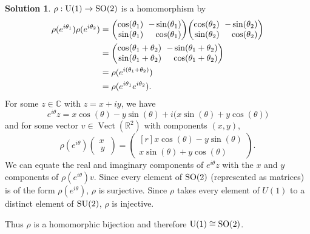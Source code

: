 \documentclass[11pt, a4paper]{report}
\theoremstyle{definition}
\newtheorem{solution}{Solution}[part]
\newenvironment{sol}{\begin{solution}}{\end{solution}\pagebreak[3]}
\newcommand*{\settightmatrix}{\ensuremath\setlength{\arraycolsep}{0.7ex}}
\newenvironment{tightmatrix}
    {\settightmatrix}{}
\newcommand*{\SO}{\ensuremath\text{SO}}
\newcommand*{\U}{\ensuremath\text{U}}
\newcommand*{\SU}{\ensuremath\text{SU}}
\DeclareMathOperator{\Vect}{Vect}
\begin{document}
\begin{sol}

$\rho: \U(1) \to \SO(2)$ is a homomorphism by
\begin{align*}
    \rho(e^{i\theta_1}) \rho(e^{i\theta_2})
        &=
        \begin{tightmatrix}\begin{pmatrix*}[r]
            \cos(\theta_1) & -\sin(\theta_1) \\
            \sin(\theta_1) & \cos(\theta_1)
        \end{pmatrix*}\end{tightmatrix}
        \begin{tightmatrix}\begin{pmatrix*}[r]
            \cos(\theta_2) & -\sin(\theta_2) \\
            \sin(\theta_2) & \cos(\theta_2)
        \end{pmatrix*}\end{tightmatrix} \\
        &=
        \begin{tightmatrix}\begin{pmatrix*}[r]
            \cos(\theta_1 + \theta_2) & -\sin(\theta_1 + \theta_2) \\
            \sin(\theta_1 + \theta_2) & \cos(\theta_1 + \theta_2)
        \end{pmatrix*}\end{tightmatrix} \\
        &= \rho(e^{i(\theta_1 + \theta_2)}) \\
        &= \rho(e^{i\theta_1}e^{i\theta_2}).
\end{align*}
For some $z \in \mathbb{C}$ with $z = x + iy$, we have
\[
    e^{i\theta} z = x \cos(\theta) - y \sin(\theta) + i \bigl( x \sin(\theta) + y \cos(\theta) \bigr)
\]
and for some vector $v \in \Vect(\mathbb{R}^2)$ with components $(x, y)$,
\[
    \rho(e^{i\theta}) \begin{pmatrix} x \\ \,y\, \end{pmatrix}
        = \begin{pmatrix*}[r]
            x \cos(\theta) - y \sin(\theta) \\
            x \sin(\theta) + y \cos(\theta)
        \end{pmatrix*}.
\]
We can equate the real and imaginary components of $e^{i\theta} z$ with the $x$ and $y$ components of $\rho(e^{i\theta}) v$.
Since every element of $\SO(2)$ (represented as matrices) is of the form $\rho(e^{i\theta})$, $\rho$ is surjective.
Since $\rho$ takes every element of $U(1)$ to a distinct element of $\SU(2)$, $\rho$ is injective.

Thus $\rho$ is a homomorphic bijection and therefore $\U(1) \cong \SO(2)$.

\end{sol}
\end{document}
